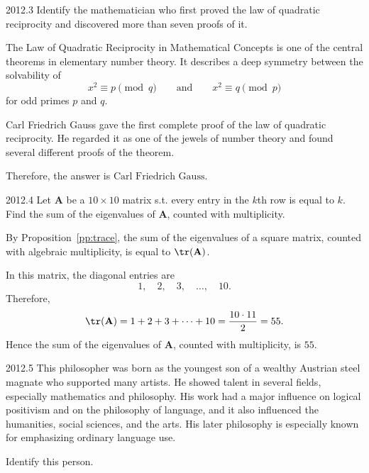     \begin{pastproblem}{2012.3}
        Identify the mathematician who first proved the law of quadratic reciprocity and discovered
        more than seven proofs of it.
    \end{pastproblem}

    \begin{solution}
        The Law of Quadratic Reciprocity in Mathematical Concepts is one of the central theorems
        in elementary number theory.
        It describes a deep symmetry between the solvability of
        \[
            x^2\equiv p \pmod q
            \qquad\text{and}\qquad
            x^2\equiv q \pmod p
        \]
        for odd primes $p$ and $q$.

        Carl Friedrich Gauss gave the first complete proof of the law of quadratic reciprocity. He
        regarded it as one of the jewels of number theory and found several different proofs of the
        theorem.

        Therefore, the answer is $\boxed{\text{Carl Friedrich Gauss}}$.
    \end{solution}

    \begin{pastproblem}{2012.4}
        Let $\mathbf{A}$ be a $10\times 10$ matrix s.t. every entry in the $k$th row is equal
        to $k$. Find the sum of the eigenvalues of $\mathbf{A}$, counted with multiplicity.
    \end{pastproblem}

    \begin{solution}
        By Proposition~\ref{pp:trace}, the sum of the eigenvalues of a square matrix, counted with algebraic multiplicity, is equal
        to $\tr(\mathbf{A})$.

        In this matrix, the diagonal entries are
        \[
            1,\quad 2,\quad 3,\quad \dots,\quad 10.
        \]
        Therefore,
        \[
            \tr(\mathbf{A})
            =
            1+2+3+\cdots+10
            =
            \frac{10\cdot 11}{2}
            =
            55.
        \]
        Hence the sum of the eigenvalues of $\mathbf{A}$, counted with multiplicity, is
        $\boxed{55}$.
    \end{solution}

    \begin{pastproblem}{2012.5}
        This philosopher was born as the youngest son of a wealthy Austrian steel magnate who
        supported many artists. He showed talent in several fields, especially mathematics and
        philosophy. His work had a major influence on logical positivism and on the philosophy of
        language, and it also influenced the humanities, social sciences, and the arts. His later
        philosophy is especially known for emphasizing ordinary language use.

        Identify this person.
    \end{pastproblem}

